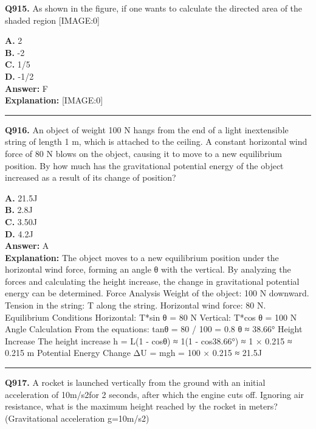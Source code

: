 \documentclass[12pt]{article}
\begin{document}
\noindent
\textbf{Q915.} As shown in the figure, if one wants to calculate the directed area of the shaded region
[IMAGE:0]



\textbf{A.} 2 \\
\textbf{B.} -2 \\
\textbf{C.} 1/5 \\
\textbf{D.} -1/2 \\

\textbf{Answer:} F \\
\textbf{Explanation:} [IMAGE:0]

\hrule
\vspace{1em}


\noindent
\textbf{Q916.} An object of weight 100 N hangs from the end of a light inextensible string of length 1 m, which is attached to the ceiling. A constant horizontal wind force of 80 N blows on the object, causing it to move to a new equilibrium position. By how much has the gravitational potential energy of the object increased as a result of its change of position?



\textbf{A.} 21.5J \\
\textbf{B.} 2.8J \\
\textbf{C.} 3.50J \\
\textbf{D.} 4.2J \\

\textbf{Answer:} A \\
\textbf{Explanation:} The object moves to a new equilibrium position under the horizontal wind force, forming an angle θ with the vertical. By analyzing the forces and calculating the height increase, the change in gravitational potential energy can be determined.
Force Analysis
Weight of the object: 100 N downward.
Tension in the string: T along the string.
Horizontal wind force: 80 N.
Equilibrium Conditions
Horizontal: T*sin
θ
= 80 N
Vertical: T*cos
θ
= 100 N
Angle Calculation
From the equations:
tanθ = 80 / 100 = 0.8 \to  θ ≈ 38.66°
Height Increase
The height increase h = L(1 - cosθ) ≈ 1(1 - cos38.66°) ≈ 1 × 0.215 ≈ 0.215 m
Potential Energy Change
ΔU = mgh = 100 × 0.215 ≈ 21.5J

\hrule
\vspace{1em}


\noindent
\textbf{Q917.} A rocket is launched vertically from the ground with an initial acceleration of 10m/s2for 2 seconds, after which the engine cuts off. Ignoring air resistance, what is the maximum height reached by the rocket in meters? (Gravitational acceleration g=10m/s2)
\end{document}
